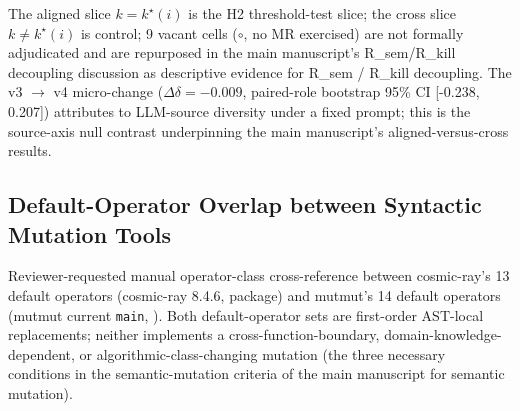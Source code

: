 \documentclass[manuscript,screen,review]{acmart}
\begin{document}
The aligned slice $k = k^\star(i)$ is the H2 threshold-test slice; the
cross slice $k \neq k^\star(i)$
is control; 9 vacant cells ($\circ$, no MR exercised) are not formally
adjudicated and are repurposed in the main manuscript's R\_sem/R\_kill decoupling discussion as descriptive evidence for
R\_sem / R\_kill decoupling. The v3 $\to$ v4 micro-change
($\Delta\delta = -0.009$, paired-role bootstrap 95\% CI [-0.238, 0.207])
attributes to LLM-source diversity under a fixed prompt; this is the
source-axis null contrast underpinning the main manuscript's aligned-versus-cross results.

\subsection{Default-Operator Overlap between Syntactic Mutation Tools}\label{b.6-mutmut-vs-cosmic-ray-default-operator-overlap}

Reviewer-requested manual operator-class cross-reference between
cosmic-ray's 13 default operators (cosmic-ray 8.4.6,
 package) and mutmut's 14 default
operators (mutmut current \texttt{main},
). Both default-operator sets
are first-order AST-local replacements; neither implements a
cross-function-boundary, domain-knowledge-dependent, or
algorithmic-class-changing mutation (the three necessary conditions in the semantic-mutation criteria of the main manuscript
for semantic mutation).
\end{document}
